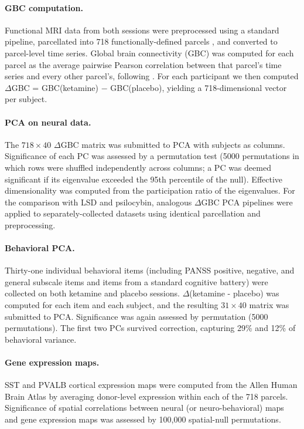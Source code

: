 \documentclass[11pt]{article}
\begin{document}
\paragraph{GBC computation.} Functional MRI data from both sessions were
preprocessed using a standard pipeline, parcellated into 718
functionally-defined parcels \citep{glasser2016multi,ji2019mapping}, and
converted to parcel-level time series. Global brain connectivity (GBC) was
computed for each parcel as the average pairwise Pearson correlation
between that parcel's time series and every other parcel's, following
\citet{cole2010globalbrain}. For each participant we then computed
$\Delta$GBC = GBC(ketamine) $-$ GBC(placebo), yielding a 718-dimensional
vector per subject.

\paragraph{PCA on neural data.} The $718 \times 40$ $\Delta$GBC matrix was
submitted to PCA with subjects as columns. Significance of each PC was
assessed by a permutation test (5000 permutations in which rows were
shuffled independently across columns; a PC was deemed significant if its
eigenvalue exceeded the 95th percentile of the null). Effective
dimensionality was computed from the participation ratio of the
eigenvalues. For the comparison with LSD and psilocybin, analogous
$\Delta$GBC PCA pipelines were applied to separately-collected datasets
using identical parcellation and preprocessing.

\paragraph{Behavioral PCA.} Thirty-one individual behavioral items
(including PANSS positive, negative, and general subscale items
\citep{kay1987positive} and items from a standard cognitive battery) were
collected on both ketamine and placebo sessions. $\Delta$(ketamine -
placebo) was computed for each item and each subject, and the resulting
$31 \times 40$ matrix was submitted to PCA. Significance was again assessed
by permutation (5000 permutations). The first two PCs survived correction,
capturing 29\% and 12\% of behavioral variance.

\paragraph{Gene expression maps.} SST and PVALB cortical expression maps
were computed from the Allen Human Brain Atlas
\citep{hawrylycz2012anatomically} by averaging donor-level expression
within each of the 718 parcels. Significance of spatial correlations
between neural (or neuro-behavioral) maps and gene expression maps was
assessed by 100{,}000 spatial-null permutations.
\end{document}
